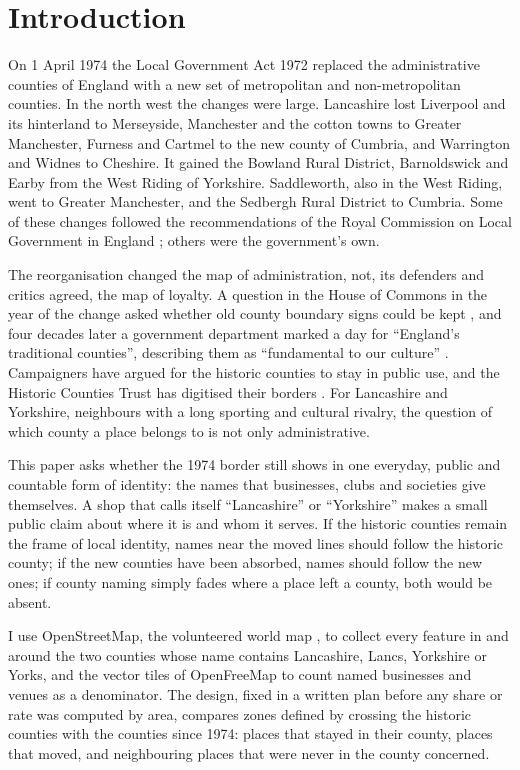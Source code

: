 \documentclass[11pt,a4paper]{article}
\begin{document}
\section{Introduction}
On 1 April 1974 the Local Government Act 1972 \citep{lga1972} replaced the administrative counties of England with a new set of metropolitan and non-metropolitan counties. In the north west the changes were large. Lancashire lost Liverpool and its hinterland to Merseyside, Manchester and the cotton towns to Greater Manchester, Furness and Cartmel to the new county of Cumbria, and Warrington and Widnes to Cheshire. It gained the Bowland Rural District, Barnoldswick and Earby from the West Riding of Yorkshire. Saddleworth, also in the West Riding, went to Greater Manchester, and the Sedbergh Rural District to Cumbria. Some of these changes followed the recommendations of the Royal Commission on Local Government in England \citep{rc1969}; others were the government's own.

The reorganisation changed the map of administration, not, its defenders and critics agreed, the map of loyalty. A question in the House of Commons in the year of the change asked whether old county boundary signs could be kept \citep{hansard1974}, and four decades later a government department marked a day for ``England's traditional counties'', describing them as ``fundamental to our culture'' \citep{dclg2013}. Campaigners have argued for the historic counties to stay in public use, and the Historic Counties Trust has digitised their borders \citep{hcbp2024}. For Lancashire and Yorkshire, neighbours with a long sporting and cultural rivalry, the question of which county a place belongs to is not only administrative.

This paper asks whether the 1974 border still shows in one everyday, public and countable form of identity: the names that businesses, clubs and societies give themselves. A shop that calls itself ``Lancashire'' or ``Yorkshire'' makes a small public claim about where it is and whom it serves. If the historic counties remain the frame of local identity, names near the moved lines should follow the historic county; if the new counties have been absorbed, names should follow the new ones; if county naming simply fades where a place left a county, both would be absent.

I use OpenStreetMap, the volunteered world map \citep{goodchild2007,haklay2010}, to collect every feature in and around the two counties whose name contains Lancashire, Lancs, Yorkshire or Yorks, and the vector tiles of OpenFreeMap to count named businesses and venues as a denominator. The design, fixed in a written plan before any share or rate was computed by area, compares zones defined by crossing the historic counties with the counties since 1974: places that stayed in their county, places that moved, and neighbouring places that were never in the county concerned.
\end{document}
